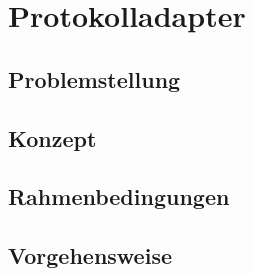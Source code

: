 \chapter{Protokolladapter}
\thispagestyle{standard}
\pagestyle{standard}

\section{Problemstellung}


\section{Konzept}

\section{Rahmenbedingungen}

\section{Vorgehensweise}
